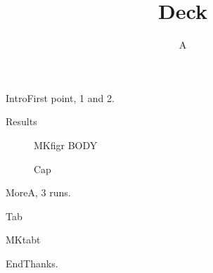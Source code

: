 \documentclass{beamer}
\title{Deck}\author{A}
\begin{document}
\begin{frame}\titlepage\end{frame}
\begin{frame}{Intro}First point, 1 and 2.\end{frame}
\begin{frame}{Results}\begin{figure}\centering MKfigr BODY\caption{Cap}\label{fig:r}\end{figure}\end{frame}
\begin{frame}{More}A, 3 runs.\end{frame}
\begin{frame}{Tab}\begin{table}\centering MKtabt\caption{T}\label{tab:t}\end{table}\end{frame}
\begin{frame}{End}Thanks.\end{frame}
\end{document}
